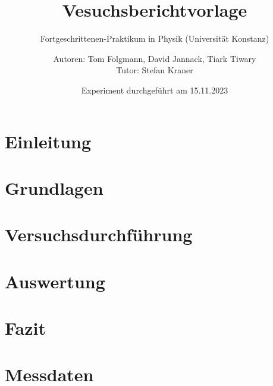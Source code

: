 \documentclass[
    oneside, 
    footinclude=off, 
    captions=tableheading, 
    DIV=12;usenames,
    dvipsnames
]{scrartcl}
\begin{document}
    \title{Vesuchsberichtvorlage}
    \subtitle{Fortgeschrittenen-Praktikum in Physik (Universität Konstanz)}
    \author{Autoren: Tom Folgmann, David Jannack, Tiark Tiwary \\ \large{Tutor: Stefan Kraner}}
    \date{Experiment durchgeführt am 15.11.2023}
    \maketitle
    \thispagestyle{empty}
    \section*{Einleitung}
        

    \newpage


    \tableofcontents
    \thispagestyle{empty}	
    \newpage
    \setcounter{page}{1}


\newpage
\section{Grundlagen}
    

\newpage
\section{Versuchsdurchführung} %
    

\newpage
\section{Auswertung}
    

\newpage
\section{Fazit}
    


\newpage
    
\newpage
    \listoffigures
    \listoftables


\newpage
    \section*{Messdaten}
    
\newpage
    



%
\end{document}
